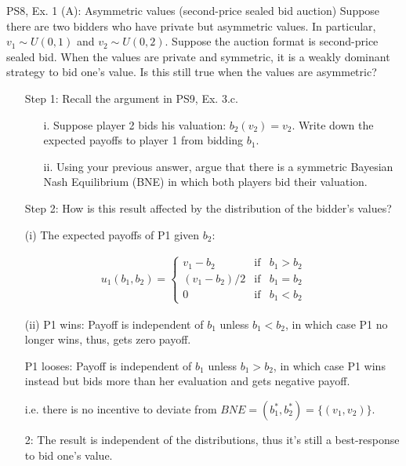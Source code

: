 \begin{frame}{PS8, Ex. 1 (A): Asymmetric values (second-price sealed bid auction)}
    Suppose there are two bidders who have private but asymmetric values. In particular, $v_1\sim U(0, 1)$ and $v_2\sim U(0, 2)$. Suppose the auction format is second-price sealed bid. When the values are private and symmetric, it is a weakly dominant strategy to bid one’s value. Is this still true when the values are asymmetric?
    \begin{multicols}{2}
      \begin{itemize}
        \item[Step 1:] Recall the argument in PS9, Ex. 3.c.
        \begin{itemize}\normalsize
          \item[i.]   Suppose player 2 bids his valuation: $b_2(v_2) = v_2$. Write down the expected payoffs to player 1 from bidding $b_1$.
          \item[ii.]  Using your previous answer, argue that there is a symmetric Bayesian Nash Equilibrium (BNE) in which both players bid their valuation.
        \end{itemize}
        \item[Step 2:] How is this result affected by the distribution of the bidder's values?
      \end{itemize}
      \vfill\null\columnbreak
      \begin{itemize}
        \item[(i)] The expected payoffs of P1 given $b_2$:
      \end{itemize}
      \vspace{-12pt}
      \begin{align*}
        u_1(b_1,b_2)=\left\{\begin{array}{lcl}
          v_1-b_2     & \text{if} & b_1>b_2 \\
          (v_1-b_2)/2 & \text{if} & b_1=b_2 \\
          0           & \text{if} & b_1<b_2
        \end{array}\right.
      \end{align*}
      \vspace{-18pt}
      \begin{itemize}
        \item[(ii)] P1 wins: Payoff is independent of $b_1$ unless $b_1<b_2$, in which case P1 no longer wins, thus, gets zero payoff.
        \item[] P1 looses: Payoff is independent of $b_1$ unless $b_1>b_2$, in which case P1 wins instead but bids more than her evaluation and gets negative payoff.
        \item[] i.e. there is no incentive to deviate from $BNE=(b_1^*,b_2^*)=\{(v_1,v_2)\}$.
        \item[2:] The result is independent of the distributions, thus it's still a best-response to bid one's value.
      \end{itemize}
      \vfill\null
    \end{multicols}
\end{frame}




